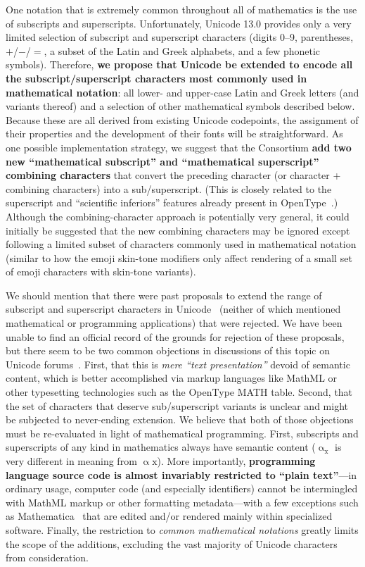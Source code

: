 \documentclass[10pt,english]{article}
\begin{document}
One notation that is extremely common throughout all of mathematics
is the use of subscripts and superscripts. Unfortunately, Unicode
13.0 provides only a very limited selection of subscript and superscript
characters (digits 0--9, parentheses, $+$/$-$/$=$, a subset of
the Latin and Greek alphabets, and a few phonetic symbols). Therefore,\textbf{
we propose that Unicode be extended to encode all the subscript/superscript
characters most commonly used in mathematical notation}: all lower-
and upper-case Latin and Greek letters (and variants thereof) and
a selection of other mathematical symbols described below. Because
these are all derived from existing Unicode codepoints, the assignment
of their properties and the development of their fonts will be straightforward.
As one possible implementation strategy, we suggest that the Consortium
\textbf{add two new ``mathematical subscript'' and ``mathematical
superscript'' combining characters} that convert the preceding character
(or character + combining characters) into a sub/superscript. (This is
closely related to the superscript and ``scientific
inferiors'' features already present in OpenType~\cite{OpenType}.)
Although the combining-character approach is potentially very general, it could
initially be suggested that the new combining characters may be ignored
except following a limited subset of characters commonly used in
mathematical notation (similar to how the emoji skin-tone modifiers only affect
rendering of a small set of emoji characters with skin-tone variants).

We should mention that there were past proposals to extend the range
of subscript and superscript characters in Unicode~\cite{L2-10-230,L2-11-208}
(neither of which mentioned mathematical or programming applications)
that were rejected. We have been unable to find an official record
of the grounds for rejection of these proposals, but there seem to
be two common objections in discussions of this topic on Unicode forums~\cite{Miller10,UCDF}.
First, that this is \emph{mere ``text presentation''}
devoid of semantic content, which is better accomplished via markup
languages like MathML or other typesetting technologies such as the OpenType MATH table. Second, that
the set of characters that deserve sub/superscript variants is unclear
and might be subjected to never-ending extension. We believe that
both of those objections must be re-evaluated in light of mathematical
programming. First, subscripts and superscripts of any kind in mathematics
always have semantic content ($\mathrm{{\upalpha_{x}}}$ is very different
in meaning from $\mathrm{\upalpha\mathrm{{x}}}$). More importantly, \textbf{programming
language source code is almost invariably restricted to ``plain text''}---in
ordinary usage, computer code (and especially identifiers) cannot
be intermingled with MathML markup or other formatting metadata---with
a few exceptions such as Mathematica~\cite{Mathematica} that are
edited and/or rendered mainly within specialized software. Finally,
the restriction to
\emph{common mathematical notations} greatly limits the scope
of the additions, excluding the vast majority of Unicode characters
from consideration.
\end{document}
